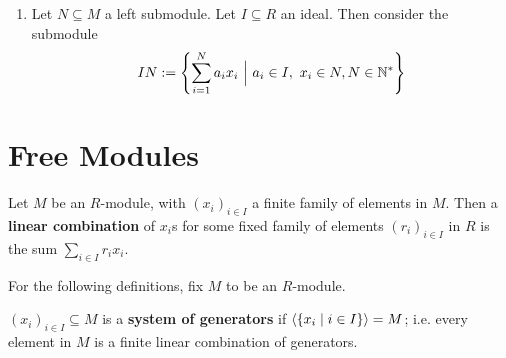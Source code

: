 \begin{enumerate}
\begin{proof}
            \begin{minipage}{\linewidth}
                \centering
            \end{minipage}

            In order to apply the first isomorphism theorem, it suffices to show that $M_1 \cap M_2 = \ker f$: as then the universal property grants the existence of such $h$, which allows the application of the First Isomorphism Theorem. This is indeed the case, as
            \begin{itemize}
                \item $M_1 \cap M_2 \subseteq \ker f$, as $M_1 \cap M_2 \subseteq M_2$ which is mapped to 0 by $f$.
                \item $M_1 \cap M_2 \supseteq \ker f$. For all $x\in \ker f$, by hypothesis $x\in M_1$; and the only elements that are annihilated by the quotient are those in $M_2$.
            \end{itemize}
        \end{proof}
    \item Let $N\subseteq M$ a left submodule. Let $I\subseteq R$ an ideal. Then consider the submodule
         \[
             IN := \left\{ \sum\limits_{i=1}^{N} a_i x_i \ \Big|\  a_i \in I,\ x_i\in N, N\in \mathbb{N}^* \right\}
         \]
\end{enumerate}

\section{Free Modules}

\begin{definition}
    Let $M$ be an $R$-module, with $(x_i)_{i\in I}$ a finite family of elements in $M$. Then a \textbf{linear combination} of $x_i$s for some fixed family of elements $(r_i)_{i\in I}$ in $R$ is the sum $\sum\limits_{i\in I} r_i x_i$.
\end{definition}

For the following definitions, fix $M$ to be an $R$-module.
\begin{definition}
    $(x_i)_{i\in I} \subseteq M$ is a \textbf{system of generators} if $\left\langle \{x_i \mid i\in I \} \right\rangle = M$; i.e. every element in $M$ is a finite linear combination of generators.
\end{definition}

